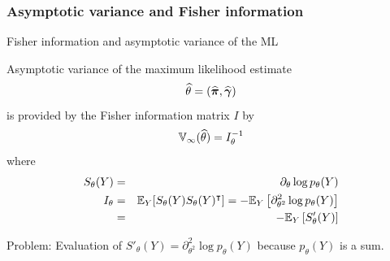 \documentclass[compress,10pt]{beamer}
\begin{document}
\subsubsection{Asymptotic variance and Fisher information}


\begin{frame}{Fisher information and asymptotic variance of the ML}

Asymptotic variance of the maximum likelihood estimate
$$
\widehat{\theta} = (\widehat{\boldsymbol{\pi}}, \widehat{\boldsymbol{\gamma}})
$$
is provided by the Fisher information matrix $I$ by
$$
\mathbb{V}_{\infty}(\widehat{\theta}) = I_\theta^{-1}
$$
where
\begin{eqnarray*}
 S_\theta(Y) &=& \partial_\theta \log p_\theta(Y)\\
I_\theta &=& \mathbb{E}_Y[S_\theta(Y) S_\theta(Y)^{\intercal}]
 = - \mathbb{E}_{Y}\left[\partial^2_{\theta^2} \log p_\theta(Y)\right]\\
 &=& -\mathbb{E}_{Y}\left[S'_\theta(Y)\right]
\end{eqnarray*}
 
 \textcolor{dgreen}{Problem}: Evaluation of $S'_\theta(Y)  = \partial^2_{\theta^2} \log p_\theta(Y)$ because $p_\theta(Y)$ is a sum. 
\end{frame}
\end{document}
